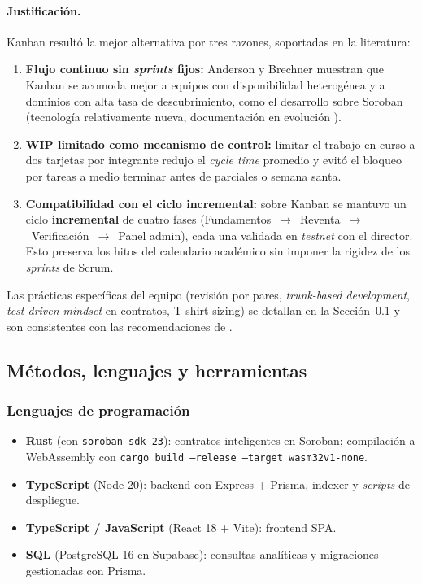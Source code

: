 \documentclass[12pt,oneside]{report}
\begin{document}
      \paragraph{Justificación.} Kanban resultó la mejor alternativa por tres razones, soportadas en la literatura:
      \begin{enumerate}
        \item \textbf{Flujo continuo sin \textit{sprints} fijos:} Anderson \cite{anderson2010} y Brechner \cite{brechner2015} muestran que Kanban se acomoda mejor a equipos con disponibilidad heterogénea y a dominios con alta tasa de descubrimiento, como el desarrollo sobre Soroban (tecnología relativamente nueva, documentación en evolución \cite{stellardocs}).
        \item \textbf{WIP limitado como mecanismo de control:} limitar el trabajo en curso a dos tarjetas por integrante redujo el \textit{cycle time} promedio y evitó el bloqueo por tareas a medio terminar antes de parciales o semana santa.
        \item \textbf{Compatibilidad con el ciclo incremental:} sobre Kanban se mantuvo un ciclo \textbf{incremental} de cuatro fases (Fundamentos~$\rightarrow$~Reventa~$\rightarrow$~Verificación~$\rightarrow$~Panel admin), cada una validada en \textit{testnet} con el director. Esto preserva los hitos del calendario académico sin imponer la rigidez de los \textit{sprints} de Scrum.
      \end{enumerate}

      Las prácticas específicas del equipo (revisión por pares, \textit{trunk-based development}, \textit{test-driven mindset} en contratos, T-shirt sizing) se detallan en la Sección~\ref{subsec:herramientas} y son consistentes con las recomendaciones de \cite{anderson2010,beck2002,humble2010}.

    \subsection{Métodos, lenguajes y herramientas}
    \label{subsec:herramientas}

      \subsubsection{Lenguajes de programación}
      \begin{itemize}
        \item \textbf{Rust} (con \texttt{soroban-sdk 23}): contratos inteligentes en Soroban; compilación a WebAssembly con \texttt{cargo build --release --target wasm32v1-none}.
        \item \textbf{TypeScript} (Node 20): backend con Express + Prisma, indexer y \textit{scripts} de despliegue.
        \item \textbf{TypeScript / JavaScript} (React 18 + Vite): frontend SPA.
        \item \textbf{SQL} (PostgreSQL 16 en Supabase): consultas analíticas y migraciones gestionadas con Prisma.
      \end{itemize}
\end{document}
